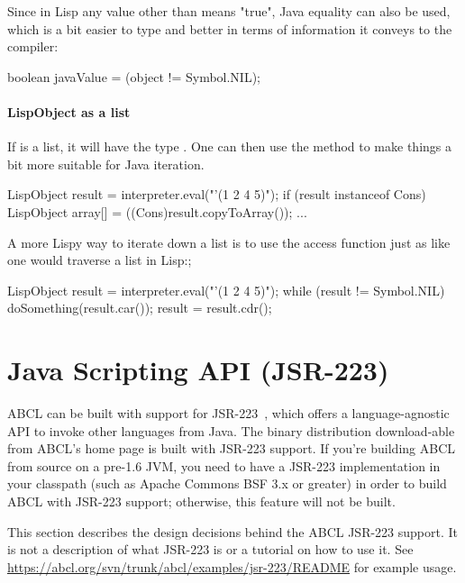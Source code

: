 \documentclass[10pt]{book}
\begin{document}
Since in Lisp any value other than  means "true", Java
equality can also be used, which is a bit easier to type and better in
terms of information it conveys to the compiler:

\begin{listing-java}
    boolean javaValue = (object != Symbol.NIL);
\end{listing-java}

\paragraph{LispObject as a list}

If  is a list, it will have the type .  One
can then use the  method to make things a bit more
suitable for Java iteration.

\begin{listing-java}
  LispObject result = interpreter.eval("'(1 2 4 5)");
  if (result instanceof Cons) {
    LispObject array[] = ((Cons)result.copyToArray());
    ...
  }
\end{listing-java}

A more Lispy way to iterate down a list is to use the  access
function just as like one would traverse a list in Lisp:;

\begin{listing-java}
  LispObject result = interpreter.eval("'(1 2 4 5)");
  while (result != Symbol.NIL) {
    doSomething(result.car());
    result = result.cdr();
  }
\end{listing-java}

\section{Java Scripting API (JSR-223)}
\label{section:java-scripting-api}

ABCL can be built with support for JSR-223~\cite{jsr-223}, which offers
a language-agnostic API to invoke other languages from Java. The binary
distribution download-able from ABCL's home page is built with JSR-223
support. If you're building ABCL from source on a pre-1.6 JVM, you need
to have a JSR-223 implementation in your classpath (such as Apache
Commons BSF 3.x or greater) in order to build ABCL with JSR-223 support;
otherwise, this feature will not be built.

This section describes the design decisions behind the ABCL JSR-223
support. It is not a description of what JSR-223 is or a tutorial on
how to use it. See
\url{https://abcl.org/svn/trunk/abcl/examples/jsr-223/README}
for example usage.
\end{document}
